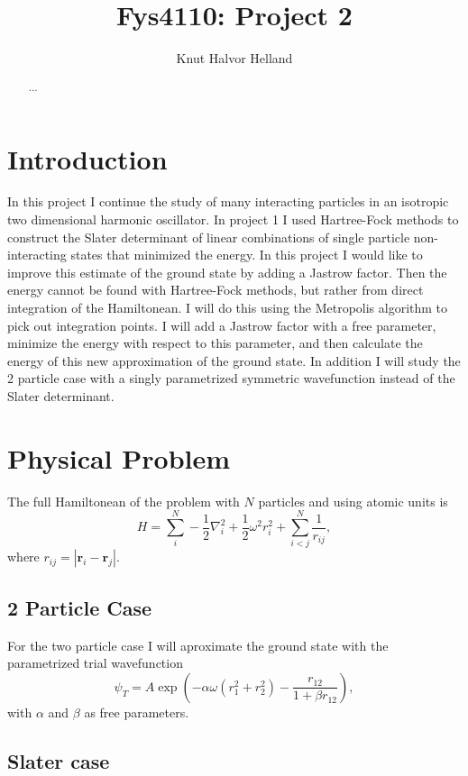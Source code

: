\documentclass[a4paper,norsk,10pt]{article}
\title{Fys4110: Project 2}
\author{Knut Halvor Helland}
\newcommand{\bb}[1]{\boldsymbol{#1}}
\newcommand{\be}{\begin{equation}}
\newcommand{\ee}{\end{equation}}
\newcommand{\f}{\frac}
\begin{document}
\maketitle{}
\begin{abstract}
$\ldots$
\end{abstract}


\section{Introduction}
In this project I continue the study of many interacting particles in an isotropic two dimensional harmonic oscillator.
In project 1 \cite{proj1} I used Hartree-Fock methods to construct the Slater determinant of linear combinations of single
particle non-interacting states that minimized the energy. In this project I would like to improve this estimate of the ground state
by adding a Jastrow factor. Then the energy cannot be found with Hartree-Fock methods, but rather from direct integration of the Hamiltonean.
I will do this using the Metropolis algorithm to pick out integration points.
I will add a Jastrow factor with a free parameter, minimize the energy with respect to this parameter, and
then calculate the energy of this new approximation of the ground state.
In addition I will study the 2 particle case with a singly parametrized symmetric wavefunction instead of the Slater determinant.


\section{Physical Problem}
The full Hamiltonean of the problem with $N$ particles and using atomic units is
\be
H = \sum_i^N -\f{1}{2}\nabla^2_i + \f{1}{2}\omega^2r^2_i + \sum_{i<j}^N\f{1}{r_{ij}}, \label{ham}
\ee
where $r_{ij} = |\bb{r}_i-\bb{r}_j|$.

\subsection{2 Particle Case}
For the two particle case I will aproximate the ground state with the parametrized trial wavefunction
\be
\psi_T = A\exp\left(-\alpha\omega(r_1^2 + r_2^2) -\f{r_{12}}{1+\beta r_{12}}\right),\label{2pw}
\ee
with $\alpha$ and $\beta$ as free parameters.

\subsection{Slater case}
\end{document}

